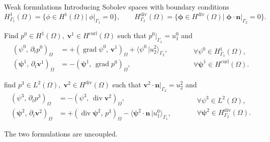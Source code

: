 \documentclass[aspectratio=169]{beamer}
\DeclareMathOperator*{\grad}{grad}
\renewcommand{\div}{\operatorname{div}}
\DeclareMathOperator*{\curl}{curl}
\newcommand{\inpr}[3][]{\ensuremath{( #2, \, #3 )_{#1}}}
\newcommand{\dualpr}[3][]{\ensuremath{\langle #2 \, \vert #3 \rangle_{#1}}}
\begin{document}
\begin{frame}{Weak formulations}
Introducing Sobolev spaces with boundary conditions	
\begin{equation*}
		H^1_{\Gamma_1}(\Omega) = \{\phi \in H^1(\Omega) |\; \phi|_{\Gamma_1} = 0\}, \qquad
		H^{\div}_{\Gamma_2}(\Omega) = \{\bm{\phi} \in H^{\div}(\Omega) |\; \bm{\phi} \cdot \bm{n}|_{\Gamma_2} = 0\}.
\end{equation*}


\begin{tcolorbox}[nobeforeafter, colframe=theme,title=Primal weak formulation]%
Find $p^0 \in H^1(\Omega), \; \bm{v}^1 \in H^{\curl}(\Omega)$ such that $p^0|_{\Gamma_1} = u^0_1$ and
\begin{equation*}
	\begin{aligned}
		\inpr[\Omega]{\psi^0}{\partial_t p^0} &= +\inpr[\Omega]{\grad \psi^0}{\bm{v}^1} + \dualpr[\Gamma_2]{\psi^0}{u^2_2}, \\
		\inpr[\Omega]{\bm{\psi}^1}{\partial_t \bm{v}^1} &= -\inpr[\Omega]{\bm{\psi}^1}{\grad {p}^0},
	\end{aligned} \qquad
	\begin{aligned}
		&\forall \psi^0 \in H^1_{\Gamma_1}(\Omega), \\
		&\forall \bm{\psi}^1 \in H^{\curl}(\Omega).
	\end{aligned}
\end{equation*}
\end{tcolorbox} 

\begin{tcolorbox}[nobeforeafter, colframe=theme,title=Dual weak formulation]%
find $p^3 \in L^2(\Omega), \; \bm{v}^2 \in H^{\div}(\Omega)$ such that $\bm{v}^2 \cdot \bm{n}|_{\Gamma_2} = u^2_2$ and
\begin{equation*}
	\begin{aligned}
		\inpr[\Omega]{\psi^3}{\partial_t p^3} &= -\inpr[\Omega]{\psi^3}{\div\bm{v}^2}, \\
		\inpr[\Omega]{\bm{\psi}^2}{\partial_t \bm{v}^2} &= +\inpr[\Omega]{\div \bm{\psi}^2}{p^3} - \dualpr[\Gamma_1]{\bm{\psi}^2 \cdot \bm{n}}{u^0_1},
	\end{aligned} \qquad
	\begin{aligned}
		&\forall \psi^3 \in L^2(\Omega), \\
		&\forall \bm{\psi}^2 \in H^{\div}_{\Gamma_2}(\Omega).
	\end{aligned}
\end{equation*}
\end{tcolorbox} 
The two formulations are uncoupled.
\end{frame}
\end{document}

